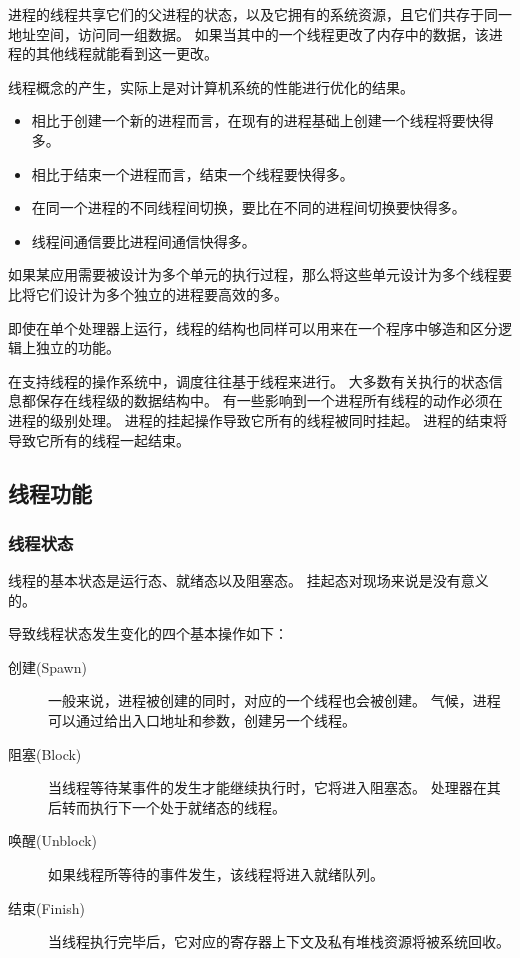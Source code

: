 {{        进程的线程共享它们的父进程的状态，以及它拥有的系统资源，且它们共存于同一地址空间，访问同一组数据。
        如果当其中的一个线程更改了内存中的数据，该进程的其他线程就能看到这一更改。

        线程概念的产生，实际上是对计算机系统的性能进行优化的结果。

        \begin{itemize}
            \item 相比于创建一个新的进程而言，在现有的进程基础上创建一个线程将要快得多。
            \item 相比于结束一个进程而言，结束一个线程要快得多。
            \item 在同一个进程的不同线程间切换，要比在不同的进程间切换要快得多。
            \item 线程间通信要比进程间通信快得多。
        \end{itemize}

        如果某应用需要被设计为多个单元的执行过程，那么将这些单元设计为多个线程要比将它们设计为多个独立的进程要高效的多。

        即使在单个处理器上运行，线程的结构也同样可以用来在一个程序中够造和区分逻辑上独立的功能。

        在支持线程的操作系统中，调度往往基于线程来进行。
        大多数有关执行的状态信息都保存在线程级的数据结构中。
        有一些影响到一个进程所有线程的动作必须在进程的级别处理。
        进程的挂起操作导致它所有的线程被同时挂起。
        进程的结束将导致它所有的线程一起结束。
    }

    \subsection{线程功能}
    {
        \subsubsection{线程状态}
        {
            线程的基本状态是运行态、就绪态以及阻塞态。
            挂起态对现场来说是没有意义的。

            导致线程状态发生变化的四个基本操作如下：

            \begin{description}
                \item[创建(Spawn)]
                {
                    一般来说，进程被创建的同时，对应的一个线程也会被创建。
                    气候，进程可以通过给出入口地址和参数，创建另一个线程。
                }
                \item[阻塞(Block)]
                {
                    当线程等待某事件的发生才能继续执行时，它将进入阻塞态。
                    处理器在其后转而执行下一个处于就绪态的线程。
                }
                \item[唤醒(Unblock)] 如果线程所等待的事件发生，该线程将进入就绪队列。
                \item[结束(Finish)] 当线程执行完毕后，它对应的寄存器上下文及私有堆栈资源将被系统回收。
            \end{description}
        }

}}
